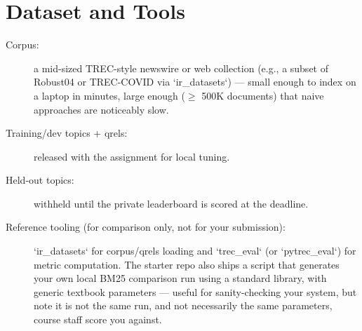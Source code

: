 \documentclass[10pt]{article}
\begin{document}
\section{Dataset and Tools}
\begin{description}
\item [Corpus:] a mid-sized TREC-style newswire or web collection (e.g., a subset of Robust04 or TREC-COVID via `ir\_datasets`) — small enough to index on a laptop in minutes, large enough ($\ge$ 500K documents) that naive approaches are noticeably slow.
\item [Training/dev topics + qrels:] released with the assignment for local tuning.
\item [Held-out topics:] withheld until the private leaderboard is scored at the deadline.
\item [Reference tooling (for comparison only, not for your submission):] `ir\_datasets` for corpus/qrels loading and `trec\_eval` (or `pytrec\_eval`) for metric computation. The starter repo also ships a script that generates your own local BM25 comparison run using a standard library, with generic textbook parameters — useful for sanity-checking your system, but note it is not the same run, and not necessarily the same parameters, course staff score you against.
\end{description}
\end{document}
